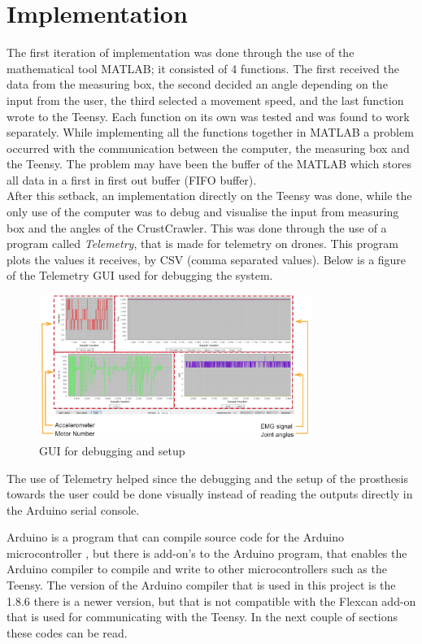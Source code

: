 \chapter{Implementation}\label{Implementation}

The first iteration of implementation was done through the use of the mathematical tool MATLAB; it consisted of 4 functions. The first received the data from the measuring box, the second decided an angle depending on the input from the user, the third selected a movement speed, and the last function wrote to the Teensy. Each function on its own was tested and was found to work separately. While implementing all the functions together in MATLAB a problem occurred with the communication between the computer, the measuring box and the Teensy. The problem may have been the buffer of the MATLAB which stores all data in a first in first out buffer (FIFO buffer). \\
After this setback, an implementation directly on the Teensy was done, while the only use of the computer was to debug and visualise the input from measuring box and the angles of the CrustCrawler. This was done through the use of a program called \textit{Telemetry}, that is made for telemetry on drones. This program plots the values it receives, by CSV (comma separated values). Below is a figure of the Telemetry GUI used for debugging the system.
\begin{figure}[H]
    \centering
    \includegraphics[width=0.79\textwidth]{Figures/Technical_figures/GUIla.png}
    \caption{GUI for debugging and setup}
    \label{fig:GUI}
\end{figure}
The use of Telemetry helped since the debugging and the setup of the prosthesis towards the user could be done visually instead of reading the outputs directly in the Arduino serial console.

Arduino is a program that can compile source code for the Arduino microcontroller , but there is add-on's to the Arduino program, that enables the Arduino compiler to compile and write to other microcontrollers such as the Teensy. The version of the Arduino compiler that is used in this project is the 1.8.6 there is a newer version, but that is not compatible with the Flexcan add-on that is used for communicating with the Teensy. In the next couple of sections these codes can be read.


